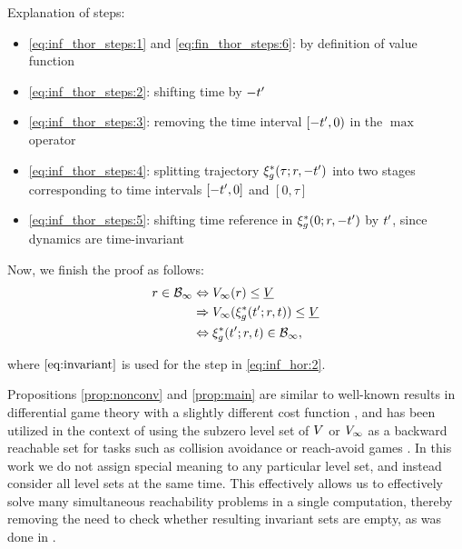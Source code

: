 \begin{IEEEproof}
Explanation of steps:
\begin{itemize}
  \item \eqref{eq:inf_thor_steps:1} and \eqref{eq:fin_thor_steps:6}: by definition of value function
  \item \eqref{eq:inf_thor_steps:2}: shifting time by $-t'$
  \item \eqref{eq:inf_thor_steps:3}: removing the time interval $[-t',0)$ in the $\max$ operator
  \item \eqref{eq:inf_thor_steps:4}: splitting trajectory $\xi_g^*(\tau; r, -t')$ into two stages corresponding to time intervals $[-t', 0]$ and $[0, \tau]$
  \item \eqref{eq:inf_thor_steps:5}: shifting time reference in $\xi_g^*(0; r, -t')$ by $t'$, since dynamics are time-invariant
\end{itemize}

Now, we finish the proof as follows:
\begin{subequations} \label{eq:inf_hor}
  \begin{align}
  \rstate \in \TEB_\infty &\Leftrightarrow \valfunc_\infty(\rstate) \le \underline\valfunc \\
  & \Rightarrow \valfunc_\infty(\rtraj^*(\tvar'; \rstate, \tvar)) \le \underline\valfunc \label{eq:inf_hor:2}\\
  & \Leftrightarrow \rtraj^*(\tvar'; \rstate, \tvar) \in \TEB_\infty,
  \end{align}
\end{subequations}

\noindent where $\eqref{eq:invariant}$ is used for the step in \eqref{eq:inf_hor:2}.

\end{IEEEproof} 
 \begin{rem} 
   Propositions \ref{prop:nonconv} and \ref{prop:main} are similar to well-known results in differential game theory with a slightly different cost function \cite{Akametalu2014}, and has been utilized in the context of using the subzero level set of $V$ or $V_\infty$ as a backward reachable set for tasks such as collision avoidance or reach-avoid games \cite{Mitchell05}. In this work we do not assign special meaning to any particular level set, and instead consider all level sets at the same time. This effectively allows us to effectively solve many simultaneous reachability problems in a single computation, thereby removing the need to check whether resulting invariant sets are empty, as was done in \cite{Bansal2017}.
 \end{rem}